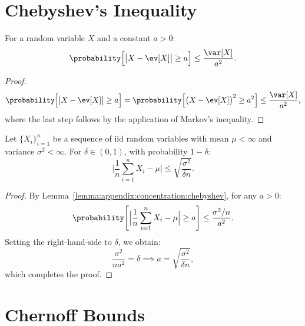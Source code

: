 \section{Chebyshev's Inequality}

\begin{lemma}
    \label{lemma:appendix:concentration:chebyshev}
    For a random variable $X$ and a constant $a > 0$:
    \begin{equation*}
        \probability \Big[ \big\lvert X - \ev[X] \big\rvert \geq a \Big] \leq \frac{\var[X]}{a^2}.
    \end{equation*}
\end{lemma}
\begin{proof}
    \begin{equation*}
        \probability \Big[ \big\lvert X - \ev[X] \big\rvert \geq a \Big] =
        \probability \Big[ \big( X - \ev[X] \big)^2 \geq a^2 \Big] \leq \frac{\var[X]}{a^2},
    \end{equation*}
    where the last step follows by the application of Markov's inequality.
\end{proof}

\begin{lemma}
    Let $\{ X_i \}_{i=1}^n$ be a sequence of iid random variables
    with mean $\mu < \infty$ and variance $\sigma^2 < \infty$. For $\delta \in (0, 1)$,
    with probability $1 - \delta$:
    \begin{equation*}
        \Big\lvert \frac{1}{n} \sum_{i = 1}^n X_i - \mu \Big\rvert \leq \sqrt{\frac{\sigma^2}{\delta n}}.
    \end{equation*}
\end{lemma}
\begin{proof}
    By Lemma~\ref{lemma:appendix:concentration:chebyshev}, for any $a > 0$:
    \begin{equation*}
        \probability \Bigg[ \Big\lvert \frac{1}{n}\sum_{i=1}^n X_i - \mu \Big\rvert \geq a \Bigg]
        \leq \frac{\sigma^2/n}{a^2}.
    \end{equation*}
    Setting the right-hand-side to $\delta$, we obtain:
    \begin{equation*}
        \frac{\sigma^2}{n a^2} = \delta \implies a = \sqrt{\frac{\sigma^2}{\delta n}},
    \end{equation*}
    which completes the proof.
\end{proof}

\section{Chernoff Bounds}


